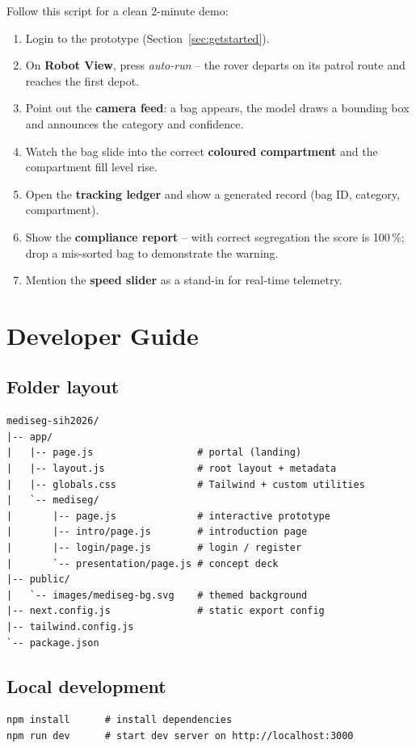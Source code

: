 \documentclass[11pt, a4paper]{article}
\begin{document}
Follow this script for a clean 2-minute demo:

\begin{enumerate}[leftmargin=1.6em, itemsep=3pt]
  \item Login to the prototype (Section~\ref{sec:getstarted}).
  \item On \textbf{Robot View}, press \emph{auto-run} -- the rover departs on
        its patrol route and reaches the first depot.
  \item Point out the \textbf{camera feed}: a bag appears, the model draws a
        bounding box and announces the category and confidence.
  \item Watch the bag slide into the correct \textbf{coloured compartment}
        and the compartment fill level rise.
  \item Open the \textbf{tracking ledger} and show a generated record (bag ID,
        category, compartment).
  \item Show the \textbf{compliance report} -- with correct segregation the
        score is 100\,\%; drop a mis-sorted bag to demonstrate the warning.
  \item Mention the \textbf{speed slider} as a stand-in for real-time telemetry.
\end{enumerate}

\section{Developer Guide}

\subsection{Folder layout}
\begin{lstlisting}[style=cmd]
mediseg-sih2026/
|-- app/
|   |-- page.js                  # portal (landing)
|   |-- layout.js                # root layout + metadata
|   |-- globals.css              # Tailwind + custom utilities
|   `-- mediseg/
|       |-- page.js              # interactive prototype
|       |-- intro/page.js        # introduction page
|       |-- login/page.js        # login / register
|       `-- presentation/page.js # concept deck
|-- public/
|   `-- images/mediseg-bg.svg    # themed background
|-- next.config.js               # static export config
|-- tailwind.config.js
`-- package.json
\end{lstlisting}

\subsection{Local development}
\begin{lstlisting}[style=cmd]
npm install      # install dependencies
npm run dev      # start dev server on http://localhost:3000
\end{lstlisting}
\end{document}
